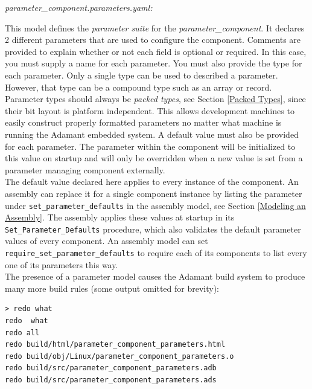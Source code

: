 \textit{parameter\_component.parameters.yaml:}

This model defines the \textit{parameter suite} for the \textit{parameter\_component}. It declares 2 different parameters that are used to configure the component. Comments are provided to explain whether or not each field is optional or required. In this case, you must supply a name for each parameter. You must also provide the type for each parameter. Only a single type can be used to described a parameter. However, that type can be a compound type such as an array or record. Parameter types should always be \textit{packed types}, see Section \ref{Packed Types}, since their bit layout is platform independent. This allows development machines to easily construct properly formatted parameters no matter what machine is running the Adamant embedded system. A default value must also be provided for each parameter. The parameter within the component will be initialized to this value on startup and will only be overridden when a new value is set from a parameter managing component externally. \\

The default value declared here applies to every instance of the component. An assembly can replace it for a single component instance by listing the parameter under \texttt{set\_parameter\_defaults} in the assembly model, see Section \ref{Modeling an Assembly}. The assembly applies these values at startup in its \texttt{Set\_Parameter\_Defaults} procedure, which also validates the default parameter values of every component. An assembly model can set \texttt{require\_set\_parameter\_defaults} to require each of its components to list every one of its parameters this way. \\

The presence of a parameter model causes the Adamant build system to produce many more build rules (some output omitted for brevity):

\vspace{5mm} %
\begin{verbatim}
> redo what 
redo  what
redo all
redo build/html/parameter_component_parameters.html
redo build/obj/Linux/parameter_component_parameters.o
redo build/src/parameter_component_parameters.adb
redo build/src/parameter_component_parameters.ads
\end{verbatim}
\vspace{5mm} %

